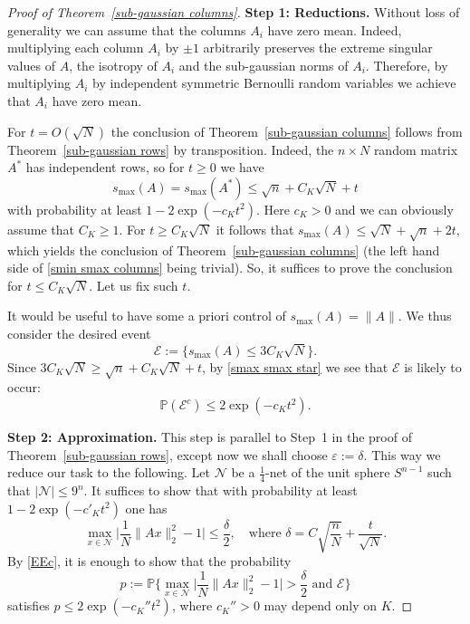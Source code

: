 \documentclass[10pt, openany]{book}
\theoremstyle{remark}
\def \P {\mathbb{P}}
\def \EE {\mathcal{E}}
\def \NN {\mathcal{N}}
\def \e {\varepsilon}
\def \d {\delta}
\def \smax {s_{\max}}
\begin{document}
\begin{proof}[Proof of Theorem~\ref{sub-gaussian columns}]
{\bf Step 1: Reductions.}
Without loss of generality we can assume that the columns $A_i$ have zero mean. 
Indeed, multiplying each column $A_i$ by $\pm 1$ arbitrarily 
preserves the extreme singular values of $A$, the isotropy of $A_i$ and
the sub-gaussian norms of $A_i$. Therefore, by multiplying
$A_i$ by independent symmetric Bernoulli random variables we achieve that $A_i$
have zero mean. 

For $t = O(\sqrt{N})$ the conclusion of Theorem~\ref{sub-gaussian columns}
follows from Theorem~\ref{sub-gaussian rows} by transposition. 
Indeed, the $n \times N$ random matrix $A^*$ has independent rows, so for $t \ge 0$ we have
\begin{equation}							\label{smax smax star}
\smax(A) = \smax(A^*) \le \sqrt{n} + C_K \sqrt{N} + t
\end{equation}
with probability at least $1 - 2 \exp(-c_K t^2)$. 
Here $c_K > 0$ and we can obviously assume that $C_K \ge 1$. 
For $t \ge C_K\sqrt{N}$ it follows that 
$\smax(A) \le \sqrt{N} + \sqrt{n} + 2t$, which
yields the conclusion of Theorem~\ref{sub-gaussian columns} 
(the left hand side of \eqref{smin smax columns} being trivial). 
So, it suffices to prove the conclusion for
$t \le C_K \sqrt{N}$.
Let us fix such $t$.

It would be useful to have some a priori control of $\smax(A) = \|A\|$. 
We thus consider the desired event 
$$
\EE := \big\{ \smax(A) \le 3C_K \sqrt{N} \big\}.
$$
Since $3C_K \sqrt{N} \ge \sqrt{n} + C_K \sqrt{N} + t$, by \eqref{smax smax star} 
we see that $\EE$ is likely to occur:
\begin{equation}										\label{EEc}
\P(\EE^c) \le 2 \exp(-c_K t^2).
\end{equation}


{\bf Step 2: Approximation.}
This step is parallel to Step~1 in the proof of Theorem~\ref{sub-gaussian rows},
except now we shall choose $\e := \d$. 
This way we reduce our task to the following. 
Let $\NN$ be a $\frac{1}{4}$-net of the unit sphere $S^{n-1}$ such that 
$|\NN| \le 9^n$.
It suffices to show that with probability at least $1 - 2\exp(-c'_K t^2)$ one has
$$
\max_{x \in \NN} \Big| \frac{1}{N} \|Ax\|_2^2 - 1 \Big| \le  \frac{\d}{2},
\quad \text{where } \d = C \sqrt{\frac{n}{N}} + \frac{t}{\sqrt{N}}.
$$
By \eqref{EEc}, it is enough to show that the probability
\begin{equation}							\label{desired p}
p:= \P \Big\{ \max_{x \in \NN} \Big| \frac{1}{N} \|Ax\|_2^2 - 1 \Big| > \frac{\d}{2} 
  \text{ and } \EE \Big\} 
\end{equation}
satisfies $p \le 2\exp(-c_K'' t^2)$,
where $c_K''>0$ may depend only on $K$.



\end{proof}
\end{document}
